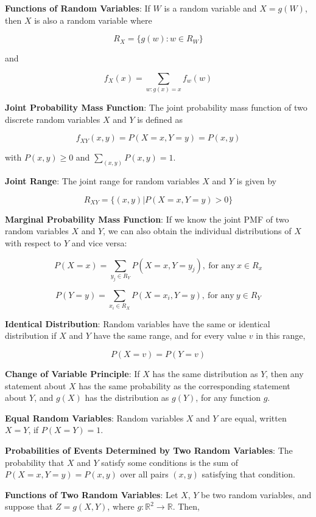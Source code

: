 \documentclass{article}
\begin{document}
\noindent\textbf{\color{orange}Functions of Random Variables}: If $W$ is a random variable and $X=g(W)$, then $X$ is also a random variable where

\[R_X=\{g(w):w\in R_W\}\]

and

\[f_X(x)=\underset{w:g(x)=x}{\sum}f_w(w)\]

\noindent\textbf{\color{blue}Joint Probability Mass Function}: The joint probability mass function of two discrete random variables $X$ and $Y$ is defined as

\[f_{XY}(x,y)=P(X=x,Y=y)=P(x,y)\]

with $P(x,y)\ge0$ and $\underset{(x,y)}{\sum}P(x,y)=1$.

\noindent\textbf{\color{blue}Joint Range}: The joint range for random variables $X$ and $Y$ is given by

\[R_{XY}=\{(x,y)|P(X=x,Y=y)>0\}\]

\noindent\textbf{\color{blue}Marginal Probability Mass Function}: If we know the joint PMF of two random variables $X$ and $Y$, we can also obtain the individual distributions of $X$ with respect to $Y$ and vice versa:

\[P(X=x)=\underset{y_j\in R_Y}{\sum}P(X=x,Y=y_j),\ \text{for any}\ x\in R_x\]

\[P(Y=y)=\underset{x_i\in R_X}{\sum}P(X=x_i,Y=y),\ \text{for any}\ y\in R_Y\]

\noindent\textbf{\color{red}Identical Distribution}: Random variables have the same or identical distribution if $X$ and $Y$ have the same range, and for every value $v$ in this range,

\[P(X=v)=P(Y=v)\]

\noindent\textbf{\color{red}Change of Variable Principle}: If $X$ has the same distribution as $Y$, then any statement about $X$ has the same probability as the corresponding statement about $Y$, and $g(X)$ has the distribution as $g(Y)$, for any function $g$.

\noindent\textbf{\color{red}Equal Random Variables}: Random variables $X$ and $Y$ are equal, written $X=Y$, if $P(X=Y)=1$.

\noindent\textbf{\color{orange}Probabilities of Events Determined by Two Random Variables}: The probability that $X$ and $Y$ satisfy some conditions is the sum of $P(X=x, Y=y)=P(x,y)$ over all pairs $(x,y)$ satisfying that condition.

\noindent\textbf{\color{orange}Functions of Two Random Variables}: Let $X$, $Y$ be two random variables, and suppose that $Z=g(X,Y)$, where $g:\mathbb{R}^2\rightarrow\mathbb{R}$. Then,
\end{document}
